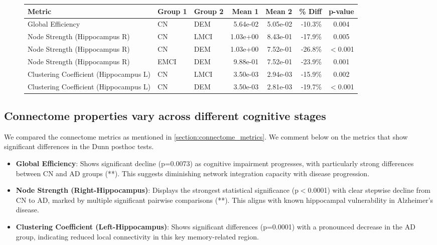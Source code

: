 \begin{figure}[b]
\begin{tcolorbox}[colback=white, colframe=black, boxrule=0.5pt, arc=0pt]
    \vskip 4mm
    \small
    \label{tab:significant_comparisons}
    \begin{tabular}{lllrrrc}
        \toprule
        \textbf{Metric} & \textbf{Group 1} & \textbf{Group 2} & \textbf{Mean 1} & \textbf{Mean 2} & \textbf{\% Diff} & \textbf{p-value} \\
        \midrule
        Global Efficiency & CN & DEM & 5.64e-02 & 5.05e-02 & -10.3\% & 0.004 \\
        Node Strength (Hippocampus R) & CN & LMCI & 1.03e+00 & 8.43e-01 & -17.9\% & 0.005 \\
        Node Strength (Hippocampus R) & CN & DEM & 1.03e+00 & 7.52e-01 & -26.8\% & $<$0.001 \\
        Node Strength (Hippocampus R) & EMCI & DEM & 9.88e-01 & 7.52e-01 & -23.9\% & 0.001 \\
        Clustering Coefficient (Hippocampus L) & CN & LMCI & 3.50e-03 & 2.94e-03 & -15.9\% & 0.002 \\
        Clustering Coefficient (Hippocampus L) & CN & DEM & 3.50e-03 & 2.81e-03 & -19.7\% & $<$0.001 \\
        \bottomrule
    \end{tabular}
\end{tcolorbox}
\end{figure}

\subsection{Connectome properties vary across different cognitive stages}\label{section:connectome_metrics_results}
We compared the connectome metrics as mentioned in \autoref{section:connectome_metrics}. 
We comment below on the metrics that show significant differences in the Dunn posthoc tests.
\begin{itemize}
    \item \textbf{Global Efficiency}: Shows significant decline (p=0.0073) as cognitive impairment progresses, with particularly strong differences between CN and AD groups (**). This suggests diminishing network integration capacity with disease progression. 
    \item \textbf{Node Strength (Right-Hippocampus)}: Displays the strongest statistical significance (p$<$0.0001) with clear stepwise decline from CN to AD, marked by multiple significant pairwise comparisons (**). This aligns with known hippocampal vulnerability in Alzheimer's disease.
    \item \textbf{Clustering Coefficient (Left-Hippocampus)}: Shows significant differences (p=0.0001) with a pronounced decrease in the AD group, indicating reduced local connectivity in this key memory-related region.
\end{itemize}




